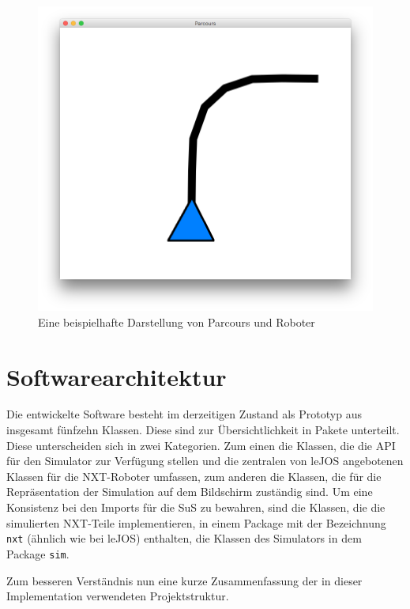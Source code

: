 \documentclass[paper=a4, pagesize, DIV=calc, BCOR=15mm, twoside=on, onecolumn=on, open = right, titlepage =on, parskip =half-, headsepline = on, footsepline = on, chapterprefix = on, appendixprefix = off, fontsize = 12pt, numbers = noenddot, abstract = on]{scrbook}
\numberwithin{equation}{chapter}
\theoremstyle{definition}
\theoremstyle{plain}
\theoremstyle{plain}
\theoremstyle{remark}
\theoremstyle{plain}
\theoremstyle{plain}
\begin{document}
\begin{figure}[htbp]
\centering
\includegraphics[scale=0.45]{images/simparcours_kurve.png} 
\caption{Eine beispielhafte Darstellung von Parcours und Roboter}
\label{fig:simparcours_kurve}
\end{figure}


\par \singlespacing
\section{Softwarearchitektur}
\onehalfspacing 

Die entwickelte Software besteht im derzeitigen Zustand als Prototyp aus insgesamt fünfzehn Klassen. Diese sind zur Übersichtlichkeit in Pakete unterteilt. Diese unterscheiden sich in zwei Kategorien. Zum einen die Klassen, die die API für den Simulator zur Verfügung stellen und die zentralen von leJOS angebotenen Klassen für die NXT-Roboter umfassen, zum anderen die Klassen, die für die Repräsentation der Simulation auf dem Bildschirm zuständig sind. Um eine Konsistenz bei den Imports für die SuS zu bewahren, sind die Klassen, die die simulierten NXT-Teile implementieren, in einem Package mit der Bezeichnung \texttt{nxt} (ähnlich wie bei leJOS) enthalten, die Klassen des Simulators in dem Package \texttt{sim}. 

Zum besseren Verständnis nun eine kurze Zusammenfassung der in dieser Implementation verwendeten Projektstruktur.
\end{document}
